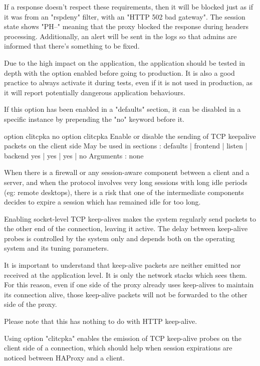   If a response doesn't respect these requirements, then it will be blocked
  just as if it was from an "rspdeny" filter, with an "HTTP 502 bad gateway".
  The session state shows "PH--" meaning that the proxy blocked the response
  during headers processing. Additionally, an alert will be sent in the logs so
  that admins are informed that there's something to be fixed.

  Due to the high impact on the application, the application should be tested
  in depth with the option enabled before going to production. It is also a
  good practice to always activate it during tests, even if it is not used in
  production, as it will report potentially dangerous application behaviours.

  If this option has been enabled in a "defaults" section, it can be disabled
  in a specific instance by prepending the "no" keyword before it.


option clitcpka
no option clitcpka
  Enable or disable the sending of TCP keepalive packets on the client side
  May be used in sections :   defaults | frontend | listen | backend
                                 yes   |    yes   |   yes  |   no
  Arguments : none

  When there is a firewall or any session-aware component between a client and
  a server, and when the protocol involves very long sessions with long idle
  periods (eg: remote desktops), there is a risk that one of the intermediate
  components decides to expire a session which has remained idle for too long.

  Enabling socket-level TCP keep-alives makes the system regularly send packets
  to the other end of the connection, leaving it active. The delay between
  keep-alive probes is controlled by the system only and depends both on the
  operating system and its tuning parameters.

  It is important to understand that keep-alive packets are neither emitted nor
  received at the application level. It is only the network stacks which sees
  them. For this reason, even if one side of the proxy already uses keep-alives
  to maintain its connection alive, those keep-alive packets will not be
  forwarded to the other side of the proxy.

  Please note that this has nothing to do with HTTP keep-alive.

  Using option "clitcpka" enables the emission of TCP keep-alive probes on the
  client side of a connection, which should help when session expirations are
  noticed between HAProxy and a client.

